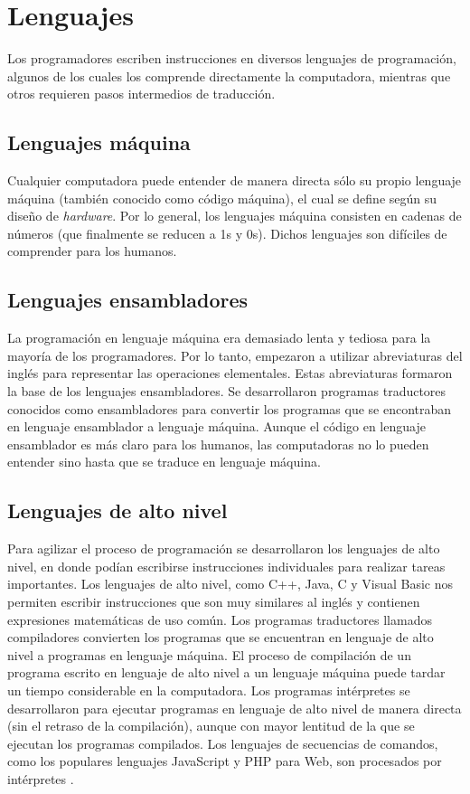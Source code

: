 \section{Lenguajes}

Los programadores escriben instrucciones en diversos lenguajes de programación, 
algunos de los cuales los comprende directamente la computadora, mientras que otros requieren pasos intermedios de traducción.

\subsection{Lenguajes máquina}
Cualquier computadora puede entender de manera directa sólo su propio lenguaje máquina (también conocido como código máquina), 
el cual se define según su diseño de \textit{hardware}. Por lo general, los lenguajes máquina consisten en cadenas de números (que finalmente se reducen a 1s y 0s). 
Dichos lenguajes son difíciles de comprender para los humanos.

\subsection{Lenguajes ensambladores}
La programación en lenguaje máquina era demasiado lenta y tediosa para la mayoría de los programadores. 
Por lo tanto, empezaron a utilizar abreviaturas del inglés para representar las operaciones elementales. 
Estas abreviaturas formaron la base de los lenguajes ensambladores. Se desarrollaron programas traductores conocidos como ensambladores para convertir los programas que se encontraban en lenguaje ensamblador a lenguaje máquina.
 Aunque el código en lenguaje ensamblador es más claro para los humanos, las computadoras no lo pueden entender sino hasta que se traduce en lenguaje máquina.

\subsection{Lenguajes de alto nivel}
Para agilizar el proceso de programación se desarrollaron los lenguajes de alto nivel, en donde podían escribirse instrucciones individuales 
para realizar tareas importantes. Los lenguajes de alto nivel, como C++, Java, C y Visual Basic nos permiten escribir instrucciones que son muy similares al inglés y 
contienen expresiones matemáticas de uso común. Los programas traductores llamados compiladores convierten los programas que se encuentran en lenguaje de alto nivel a programas en lenguaje máquina. 
El proceso de compilación de un programa escrito en lenguaje de alto nivel a un lenguaje máquina puede tardar un tiempo considerable en la computadora. Los programas intérpretes se desarrollaron para ejecutar programas en lenguaje de alto nivel de manera directa (sin el retraso de la compilación), aunque con mayor lentitud de la que se ejecutan los programas compilados. Los lenguajes de secuencias de comandos, como los populares lenguajes JavaScript y PHP para Web, son procesados por intérpretes \cite{Deitel2014}.

